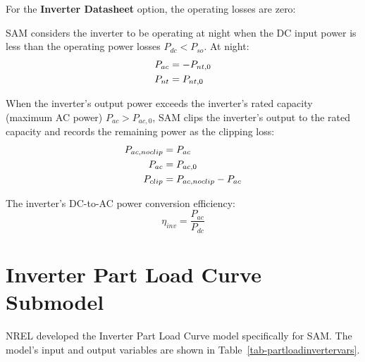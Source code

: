 \documentclass[12pt,letterpaper]{article}
\begin{document}
For the \textbf{Inverter Datasheet} option, the operating losses are zero:

SAM considers the inverter to be operating at night when the DC input power is less than the operating power losses $P_{dc} < P_{so}$. At night:
\begin{align}
P_{ac} &= -P_{nt,0} \notag\\
P_{nt} &= P_{nt,0}
\end{align}

When the inverter's output power exceeds the inverter's rated capacity (maximum AC power) $P_{ac} > P_{ac,0}$, SAM clips the inverter's output to the rated capacity and records the remaining power as the clipping loss:
\begin{align}
P_{ac,noclip} &= P_{ac} \notag\\
P_{ac} &= P_{ac,0} \notag\\
P_{clip} &= P_{ac,noclip} - P_{ac}
\end{align}

The inverter's DC-to-AC power conversion efficiency:
\begin{equation}
\eta_{inv} = \frac{P_{ac}}{P_{dc}}
\end{equation}

\section{Inverter Part Load Curve Submodel}\label{sec-partloadinverter}

NREL developed the Inverter Part Load Curve model specifically for SAM. The model's input and output variables are shown in Table~\ref{tab-partloadinvertervars}.
\end{document}
